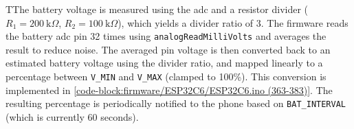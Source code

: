 TThe battery voltage is measured using the \gls{adc} and a resistor divider ($R_1 = 200~\mathrm{k}\Omega$, $R_2 = 100~\mathrm{k}\Omega$), which yields a divider ratio of 3. The firmware reads the battery \gls{adc} pin 32 times using \verb|analogReadMilliVolts| and averages the result to reduce noise. The averaged pin voltage is then converted back to an estimated battery voltage using the divider ratio, and mapped linearly to a percentage between \verb|V_MIN| and \verb|V_MAX| (clamped to 100\%). This conversion is implemented in \autoref{code-block:firmware/ESP32C6/ESP32C6.ino (363-383)}. The resulting percentage is periodically notified to the phone based on \verb|BAT_INTERVAL| (which is currently 60 seconds).

